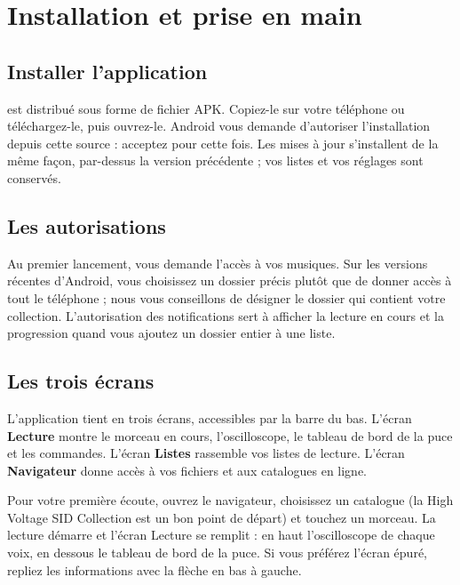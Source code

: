 \chapter{Installation et prise en main}

\section{Installer l'application}
\soft est distribué sous forme de fichier APK. Copiez-le sur votre téléphone ou téléchargez-le, puis ouvrez-le.
Android vous demande d'autoriser l'installation depuis cette source : acceptez pour cette fois. Les mises à jour
s'installent de la même façon, par-dessus la version précédente ; vos listes et vos réglages sont conservés.

\section{Les autorisations}
Au premier lancement, \soft vous demande l'accès à vos musiques. Sur les versions récentes d'Android, vous
choisissez un dossier précis plutôt que de donner accès à tout le téléphone ; nous vous conseillons de désigner le
dossier qui contient votre collection. L'autorisation des notifications sert à afficher la lecture en cours et la
progression quand vous ajoutez un dossier entier à une liste.

\section{Les trois écrans}
L'application tient en trois écrans, accessibles par la barre du bas. L'écran \textbf{Lecture} montre le morceau en
cours, l'oscilloscope, le tableau de bord de la puce et les commandes. L'écran \textbf{Listes} rassemble vos listes
de lecture. L'écran \textbf{Navigateur} donne accès à vos fichiers et aux catalogues en ligne.


Pour votre première écoute, ouvrez le navigateur, choisissez un catalogue (la High Voltage SID Collection est un bon
point de départ) et touchez un morceau. La lecture démarre et l'écran Lecture se remplit : en haut l'oscilloscope
de chaque voix, en dessous le tableau de bord de la puce. Si vous préférez l'écran épuré, repliez les informations
avec la flèche en bas à gauche.

